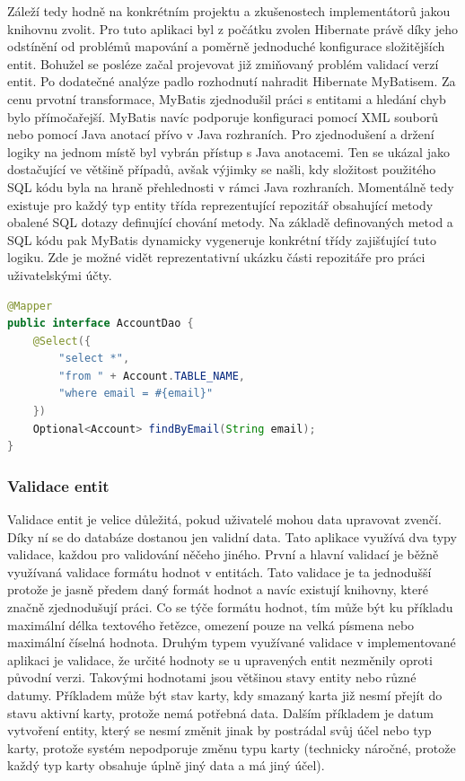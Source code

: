 		Záleží tedy hodně na konkrétním projektu a zkušenostech implementátorů jakou knihovnu zvolit.
		Pro tuto aplikaci byl z počátku zvolen Hibernate právě díky jeho odstínění od problémů mapování a poměrně
		jednoduché konfigurace složitějších entit.
		Bohužel se posléze začal projevovat již zmiňovaný problém validací verzí entit.
		Po dodatečné analýze padlo rozhodnutí nahradit Hibernate MyBatisem.
		Za cenu prvotní transformace, MyBatis zjednodušil práci s entitami a hledání chyb bylo přímočařejší.
		MyBatis navíc podporuje konfiguraci pomocí \ac{XML} souborů nebo pomocí Java anotací přívo v Java rozhraních.
		Pro zjednodušení a držení logiky na jednom místě byl vybrán přístup s Java anotacemi.
		Ten se ukázal jako dostačující ve většině případů, avšak výjimky se našli, kdy složitost použitého \ac{SQL} kódu
		byla na hraně přehlednosti v rámci Java rozhraních.
		Momentálně tedy existuje pro každý typ entity třída reprezentující repozitář obsahující metody obalené \ac{SQL}
		dotazy definující chování metody.
		Na základě definovaných metod a \ac{SQL} kódu pak MyBatis dynamicky vygeneruje konkrétní třídy zajišťující tuto
		logiku.
		Zde je možné vidět reprezentativní ukázku části repozitáře pro práci uživatelskými účty.

		\begin{lstlisting}[language=Java,caption={Ukázka získání uživatelského účtu z databáze MyBatisem. Zdroj: [autor]}]
@Mapper
public interface AccountDao {
	@Select({
		"select *",
		"from " + Account.TABLE_NAME,
		"where email = #{email}"
	})
	Optional<Account> findByEmail(String email);
}
		\end{lstlisting}

		\subsubsection{Validace entit}

		Validace entit je velice důležitá, pokud uživatelé mohou data upravovat zvenčí.
		Díky ní se do databáze dostanou jen validní data.
		Tato aplikace využívá dva typy validace, každou pro validování něčeho jiného.
		První a hlavní validací je běžně využívaná validace formátu hodnot v entitách.
		Tato validace je ta jednodušší protože je jasně předem daný formát hodnot a navíc existují knihovny, které
		značně zjednodušují práci.
		Co se týče formátu hodnot, tím může být ku příkladu maximální délka textového řetězce, omezení pouze na velká
		písmena nebo maximální číselná hodnota.
		Druhým typem využívané validace v implementované aplikaci je validace, že určité hodnoty se u upravených entit
		nezměnily oproti původní verzi.
		Takovými hodnotami jsou většinou stavy entity nebo různé datumy.
		Příkladem může být stav karty, kdy smazaný karta již nesmí přejít do stavu aktivní karty, protože nemá potřebná data.
		Dalším příkladem je datum vytvoření entity, který se nesmí změnit jinak by postrádal svůj účel nebo typ karty,
		protože systém nepodporuje změnu typu karty (technicky náročné, protože každý typ karty obsahuje úplně jiný data
		a má jiný účel).

